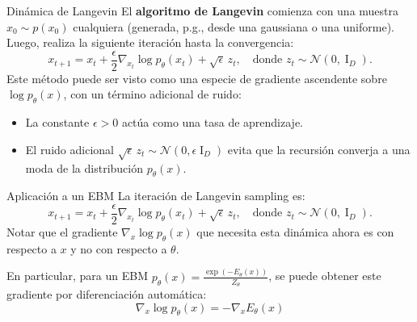 \documentclass{beamer}
\begin{document}
\begin{frame}{Dinámica de Langevin}
    El \textbf{algoritmo de Langevin} comienza con una muestra $x_0\sim p(x_0)$ cualquiera (generada, p.g., desde una gaussiana o una uniforme). Luego, realiza la siguiente iteración hasta la convergencia:
    \begin{equation*}
        x_{t+1} = x_t+\frac{\epsilon}{2} \nabla_{x_t} \log p_\theta(x_t)+\sqrt{\epsilon}\, z_t,
        \quad\text{donde }
        z_t\sim\mathcal{N}(0,\operatorname{I}_D).
    \end{equation*}
    Este método puede ser visto como una especie de gradiente ascendente sobre $\log p_\theta(x)$, con un término adicional de ruido:
    \begin{itemize}
        \item La constante $\epsilon>0$ actúa como una tasa de aprendizaje.
        \item El ruido adicional $\sqrt{\epsilon}\, z_t \sim \mathcal{N}(0,\epsilon \operatorname{I}_D)$ evita que la recursión converja a una moda de la distribución $p_\theta(x)$.
    \end{itemize}
\end{frame}

\begin{frame}{Aplicación a un EBM}
    La iteración de Langevin sampling es:
    \begin{equation*}
        x_{t+1} = x_t+\frac{\epsilon}{2} \nabla_{x_t} \log p_\theta(x_t)+\sqrt{\epsilon}\, z_t,
        \quad\text{donde }
        z_t\sim\mathcal{N}(0,\operatorname{I}_D).
    \end{equation*}
    Notar que el gradiente $\nabla_{x} \log p_\theta(x)$ que necesita esta dinámica ahora es con respecto a $x$ y no con respecto a $\theta$.

    En particular, para un EBM $p_\theta(x)=\frac{\exp\left(-E_\theta(x)\right)}{Z_\theta}$, se puede obtener este gradiente por diferenciación automática:
    \begin{equation*}
        \nabla_x\log p_\theta(x) =-\nabla_xE_\theta(x)
    \end{equation*}
\end{frame}
\end{document}
